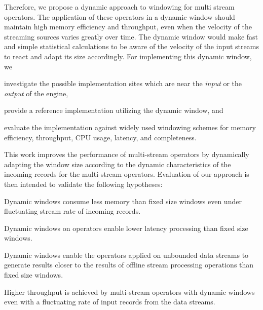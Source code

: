 Therefore, we propose a dynamic approach to windowing for multi stream operators.
The application of these operators in a dynamic window should maintain high memory efficiency and throughput,
even when the velocity of the streaming sources varies greatly over time. 
The dynamic window would make fast and simple statistical calculations to be 
aware of the velocity of the input streams to react and adapt its size accordingly. 
For implementing this dynamic window, we 
\renewcommand{\labelenumi}{(\roman{enumi})}
\begin{enumerate*}
    \item investigate the possible implementation sites which are near the \emph{input}
    or the \emph{output} of the engine, 
    \item provide a reference implementation utilizing the dynamic window, and 
    \item evaluate the implementation against widely used windowing schemes for 
    memory efficiency, throughput, CPU usage, latency, and completeness. 
\end{enumerate*}


This work improves the performance of multi-stream operators 
by dynamically adapting the window size according to the dynamic characteristics
of the incoming records for the multi-stream operators. Evaluation of 
our approach is then intended to validate the following hypotheses: 

\begin{hyp}
    Dynamic windows consume less memory than 
    fixed size windows even under fluctuating 
    stream rate of incoming records. 
\end{hyp}

\begin{hyp}
    Dynamic windows on operators enable lower latency 
    processing than fixed size windows. 
\end{hyp}

\begin{hyp}
    Dynamic windows enable the operators applied on
    unbounded data streams to generate 
    results closer to the results of offline stream processing operations
    than fixed size windows. 
\end{hyp}
\begin{hyp}
    Higher throughput is achieved by multi-stream operators 
    with dynamic windows even with a fluctuating
    rate of input records from the data streams.
\end{hyp}


